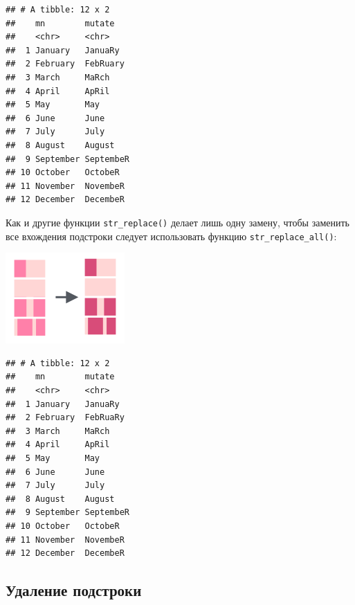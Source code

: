 \documentclass[
]{book}
\newenvironment{Shaded}{\begin{snugshade}}{\end{snugshade}}
\newcommand{\DataTypeTok}[1]{\textcolor[rgb]{0.13,0.29,0.53}{#1}}
\newcommand{\KeywordTok}[1]{\textcolor[rgb]{0.13,0.29,0.53}{\textbf{#1}}}
\newcommand{\NormalTok}[1]{#1}
\newcommand{\OperatorTok}[1]{\textcolor[rgb]{0.81,0.36,0.00}{\textbf{#1}}}
\newcommand{\StringTok}[1]{\textcolor[rgb]{0.31,0.60,0.02}{#1}}
\begin{document}
\begin{verbatim}
## # A tibble: 12 x 2
##    mn        mutate   
##    <chr>     <chr>    
##  1 January   JanuaRy  
##  2 February  FebRuary 
##  3 March     MaRch    
##  4 April     ApRil    
##  5 May       May      
##  6 June      June     
##  7 July      July     
##  8 August    August   
##  9 September SeptembeR
## 10 October   OctobeR  
## 11 November  NovembeR 
## 12 December  DecembeR
\end{verbatim}

Как и другие функции \texttt{str\_replace()} делает лишь одну замену, чтобы заменить все вхождения подстроки следует использовать функцию \texttt{str\_replace\_all()}:

\includegraphics{images/5.12_str_replace_all.png}

\begin{Shaded}
\end{Shaded}

\begin{verbatim}
## # A tibble: 12 x 2
##    mn        mutate   
##    <chr>     <chr>    
##  1 January   JanuaRy  
##  2 February  FebRuaRy 
##  3 March     MaRch    
##  4 April     ApRil    
##  5 May       May      
##  6 June      June     
##  7 July      July     
##  8 August    August   
##  9 September SeptembeR
## 10 October   OctobeR  
## 11 November  NovembeR 
## 12 December  DecembeR
\end{verbatim}

\hypertarget{ux443ux434ux430ux43bux435ux43dux438ux435-ux43fux43eux434ux441ux442ux440ux43eux43aux438}{%
\subsection{Удаление подстроки}\label{ux443ux434ux430ux43bux435ux43dux438ux435-ux43fux43eux434ux441ux442ux440ux43eux43aux438}}
\end{document}
